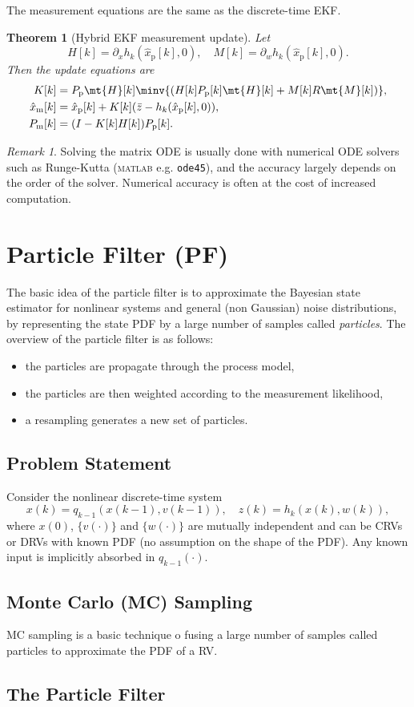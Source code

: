 \documentclass[margin=tiny]{hsrzf}
\theoremstyle{plain}
\newtheorem{thm}{Theorem}[section]
\theoremstyle{definition}
\theoremstyle{remark}
\newtheorem*{remark}{Remark}
\begin{document}
The measurement equations are the same as the discrete-time EKF.

\begin{thm}[Hybrid EKF measurement update]
  Let
  \[
    H[k] = \partial_x h_k(\hat{x}_\mathrm{p}[k], 0),
    \quad
    M[k] = \partial_w h_k(\hat{x}_\mathrm{p}[k], 0).
  \]
  Then the update equations are
  \begin{align*}
    K[k] &= P_\mathrm{p} \mt{H}[k]\minv{(
      H[k] P_\mathrm{p}[k] \mt{H}[k] + M[k] R \mt{M}[k])}, \\
    \hat{x}_\mathrm{m}[k] &= \hat{x}_\mathrm{p}[k]
      + K[k](\bar{z} - h_k(\hat{x}_\mathrm{p}[k], 0)), \\
    P_\mathrm{m}[k] &= (I - K[k] H[k]) P_\mathrm{p}[k].
  \end{align*}
\end{thm}

\begin{remark}
  Solving the matrix ODE is usually done with numerical ODE solvers such as
  Runge-Kutta (\textsc{matlab} e.g. \texttt{ode45}), and the accuracy largely
  depends on the order of the solver. Numerical accuracy is often at the cost
  of increased computation.
\end{remark}

\section{Particle Filter (PF)}

The basic idea of the particle filter is to approximate the Bayesian state
estimator for nonlinear systems and general (non Gaussian) noise
distributions, by representing the state PDF by a large number of samples
called \emph{particles}. The overview of the particle filter is as follows:
\begin{itemize}
  \item the particles are propagate through the process model,
  \item the particles are then weighted according to the measurement
    likelihood,
  \item a resampling generates a new set of particles.
\end{itemize}

\subsection{Problem Statement}

Consider the nonlinear discrete-time system
\[
  x(k) = q_{k-1}(x(k-1), v(k-1)),
  \quad
  z(k) = h_k(x(k), w(k)),
\]
where $x(0)$, $\{v(\cdot)\}$ and $\{w(\cdot)\}$ are mutually independent and
can be CRVs or DRVs with known PDF (no assumption on the shape of the PDF).
Any known input is implicitly absorbed in $q_{k-1}(\cdot)$.

\subsection{Monte Carlo (MC) Sampling}

MC sampling is a basic technique o fusing a large number of samples called
particles to approximate the PDF of a RV.

\subsection{The Particle Filter}
\end{document}
